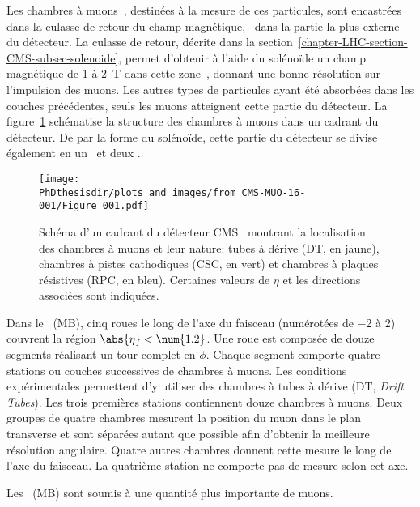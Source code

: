 \par Les chambres à muons~\cite{cms_paper,CERN-LHCC-97-032,CMS-MUO-11-001,CMS-MUO-16-001}, destinées à la mesure de ces particules, sont encastrées dans la culasse de retour du champ magnétique, \ie\ dans la partie la plus externe du détecteur.
La culasse de retour, décrite dans la section~\ref{chapter-LHC-section-CMS-subsec-solenoide}, permet d'obtenir à l'aide du solénoïde un champ magnétique de \num{1} à \SI{2}{\tesla} dans cette zone~\cite{CMS_magnetic_field}, donnant une bonne résolution sur l'impulsion des muons.
Les autres types de particules ayant été absorbées dans les couches précédentes, seuls les muons atteignent cette partie du détecteur.
La figure~\ref{fig-chapter-LHC-section-CMS-subsec-muons-CMS-MUO-16-001-Figure_001} schématise la structure des chambres à muons dans un cadrant du détecteur.
De par la forme du solénoïde, cette partie du détecteur se divise également en un \CMSbarrel\ et deux \CMSendcaps.
\begin{figure}[b]
\centering
\texttt{[image: \\PhDthesisdir/plots\_and\_images/from\_CMS-MUO-16-001/Figure\_001.pdf]}
\caption[Schéma des chambres à muons de CMS.]{Schéma d'un cadrant du détecteur CMS~\cite{CMS-MUO-16-001} montrant la localisation des chambres à muons et leur nature: tubes à dérive (DT, en jaune), chambres à pistes cathodiques (CSC, en vert) et chambres à plaques résistives (RPC, en bleu). Certaines valeurs de $\eta$ et les directions associées sont indiquées.}
\label{fig-chapter-LHC-section-CMS-subsec-muons-CMS-MUO-16-001-Figure_001}
\end{figure}
\par Dans le \CMSbarrel\ (MB), cinq roues le long de l'axe du faisceau (numérotées de \num{-2} à \num{2}) couvrent la région $\abs{\eta}<\num{1.2}$.
Une roue est composée de douze segments réalisant un tour complet en $\phi$.
Chaque segment comporte quatre stations ou couches successives de chambres à muons.
Les conditions expérimentales permettent d'y utiliser des chambres à tubes à dérive (DT, \emph{Drift Tubes}).
Les trois premières stations contiennent douze chambres à muons.
Deux groupes de quatre chambres mesurent la position du muon dans le plan transverse et sont séparées autant que possible afin d'obtenir la meilleure résolution angulaire.
Quatre autres chambres donnent cette mesure le long de l'axe du faisceau.
La quatrième station ne comporte pas de mesure selon cet axe.
\par Les \CMSendcaps\ (MB) sont soumis à une quantité plus importante de muons.
